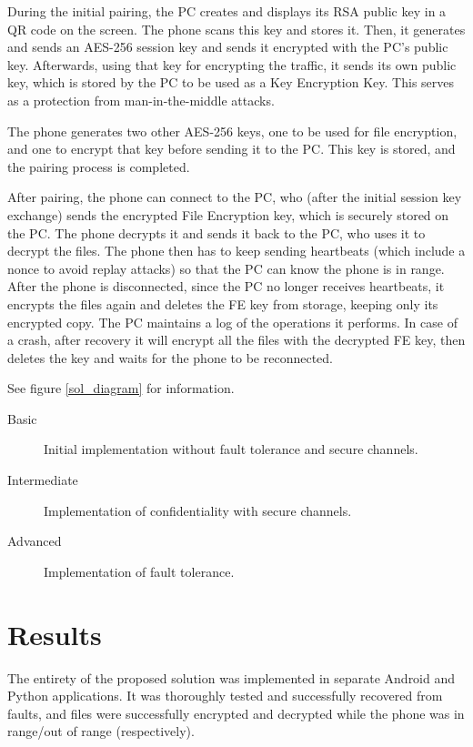 \documentclass[11,]{article}
\begin{document}
During the initial pairing, the PC creates and displays its RSA public
key in a QR code on the screen. The phone scans this key and stores it.
Then, it generates and sends an AES-256 session key and sends it
encrypted with the PC's public key. Afterwards, using that key for
encrypting the traffic, it sends its own public key, which is stored by
the PC to be used as a Key Encryption Key. This serves as a protection
from man-in-the-middle attacks.

The phone generates two other AES-256 keys, one to be used for file
encryption, and one to encrypt that key before sending it to the PC.
This key is stored, and the pairing process is completed.

After pairing, the phone can connect to the PC, who (after the initial
session key exchange) sends the encrypted File Encryption key, which is
securely stored on the PC. The phone decrypts it and sends it back to
the PC, who uses it to decrypt the files. The phone then has to keep
sending heartbeats (which include a nonce to avoid replay attacks) so
that the PC can know the phone is in range. After the phone is
disconnected, since the PC no longer receives heartbeats, it encrypts
the files again and deletes the FE key from storage, keeping only its
encrypted copy. The PC maintains a log of the operations it performs. In
case of a crash, after recovery it will encrypt all the files with the
decrypted FE key, then deletes the key and waits for the phone to be
reconnected.

See figure \ref{sol_diagram} for information.

\begin{description}
\item[Basic]
Initial implementation without fault tolerance and secure channels.
\item[Intermediate]
Implementation of confidentiality with secure channels.
\item[Advanced]
Implementation of fault tolerance.
\end{description}

\hypertarget{results}{%
\section{Results}\label{results}}

The entirety of the proposed solution was implemented in separate
Android and Python applications. It was thoroughly tested and
successfully recovered from faults, and files were successfully
encrypted and decrypted while the phone was in range/out of range
(respectively).
\end{document}
